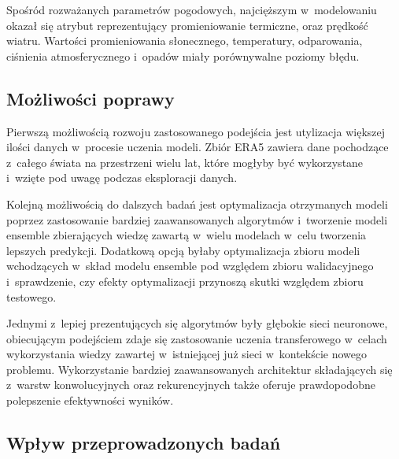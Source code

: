 Spośród rozważanych parametrów pogodowych, najcięższym w~modelowaniu okazał
się atrybut reprezentujący promieniowanie termiczne, oraz prędkość wiatru.
Wartości promieniowania słonecznego, temperatury, odparowania, ciśnienia 
atmosferycznego i~opadów miały porównywalne poziomy błędu.

\subsection*{Możliwości poprawy}\label{subsec:possibilities}


Pierwszą możliwością rozwoju zastosowanego podejścia jest utylizacja większej ilości
danych w~procesie uczenia modeli. Zbiór ERA5 zawiera dane pochodzące z~całego świata
na przestrzeni wielu lat, które mogłyby być wykorzystane i~wzięte pod uwagę podczas
eksploracji danych. 

Kolejną możliwością do dalszych badań jest optymalizacja otrzymanych modeli poprzez 
zastosowanie bardziej zaawansowanych algorytmów i~tworzenie modeli ensemble
zbierających wiedzę zawartą w~wielu modelach w~celu tworzenia lepszych 
predykcji. Dodatkową opcją byłaby optymalizacja zbioru modeli wchodzących w~skład
modelu ensemble pod względem zbioru walidacyjnego i~sprawdzenie, czy efekty 
optymalizacji przynoszą skutki względem zbioru testowego.


Jednymi z~lepiej prezentujących się algorytmów były głębokie sieci neuronowe,
obiecującym podejściem zdaje się zastosowanie uczenia transferowego w~celach 
wykorzystania wiedzy zawartej w~istniejącej już sieci w~kontekście nowego problemu.
Wykorzystanie bardziej zaawansowanych architektur składających się z~warstw konwolucyjnych
oraz rekurencyjnych także oferuje prawdopodobne polepszenie efektywności wyników.


\subsection*{Wpływ przeprowadzonych badań}\label{subsec:ending}

